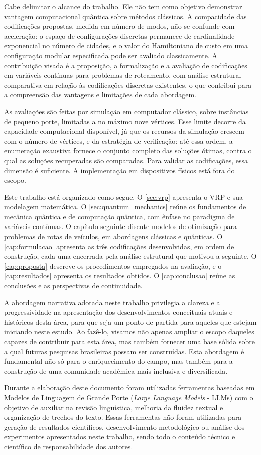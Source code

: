 Cabe delimitar o alcance do trabalho. Ele não tem como objetivo demonstrar vantagem computacional quântica sobre métodos clássicos. A compacidade das codificações propostas, medida em número de modos, não se confunde com aceleração: o espaço de configurações discretas permanece de cardinalidade exponencial no número de cidades, e o valor do Hamiltoniano de custo em uma configuração modular especificada pode ser avaliado classicamente. A contribuição visada é a proposição, a formalização e a avaliação de codificações em variáveis contínuas para problemas de roteamento, com análise estrutural comparativa em relação às codificações discretas existentes, o que contribui para a compreensão das vantagens e limitações de cada abordagem.

As avaliações são feitas por simulação em computador clássico, sobre instâncias de pequeno porte, limitadas a no máximo nove vértices. Esse limite decorre da capacidade computacional disponível, já que os recursos da simulação crescem com o número de vértices, e da estratégia de verificação: até essa ordem, a enumeração exaustiva fornece o conjunto completo das soluções ótimas, contra o qual as soluções recuperadas são comparadas. Para validar as codificações, essa dimensão é suficiente. A implementação em dispositivos físicos está fora do escopo.

Este trabalho está organizado como segue. O \autoref{sec:vrp} apresenta o VRP e sua modelagem matemática. O \autoref{sec:quantum_mechanics} reúne os fundamentos de mecânica quântica e de computação quântica, com ênfase no paradigma de variáveis contínuas. O capítulo seguinte discute modelos de otimização para problemas de rotas de veículos, em abordagens clássicas e quânticas. O \autoref{cap:formulacao} apresenta as três codificações desenvolvidas, em ordem de construção, cada uma encerrada pela análise estrutural que motivou a seguinte. O \autoref{cap:proposta} descreve os procedimentos empregados na avaliação, e o \autoref{cap:resultados} apresenta os resultados obtidos. O \autoref{cap:conclusao} reúne as conclusões e as perspectivas de continuidade.

A abordagem narrativa adotada neste trabalho privilegia a clareza e a progressividade na apresentação dos desenvolvimentos conceituais atuais e históricos desta área, para que seja um ponto de partida para aqueles que estejam iniciando neste estudo. Ao fazê-lo, visamos não apenas ampliar o escopo daqueles capazes de contribuir para esta área, mas também fornecer uma base sólida sobre a qual futuras pesquisas brasileiras possam ser construídas. Esta abordagem é fundamental não só para o enriquecimento do campo, mas também para a construção de uma comunidade acadêmica mais inclusiva e diversificada.

Durante a elaboração deste documento foram utilizadas ferramentas baseadas em Modelos de Linguagem de Grande Porte (\textit{Large Language Models} - LLMs) com o objetivo de auxiliar na revisão linguística, melhoria da fluidez textual e organização de trechos do texto. Essas ferramentas não foram utilizadas para geração de resultados científicos, desenvolvimento metodológico ou análise dos experimentos apresentados neste trabalho, sendo todo o conteúdo técnico e científico de responsabilidade dos autores.
